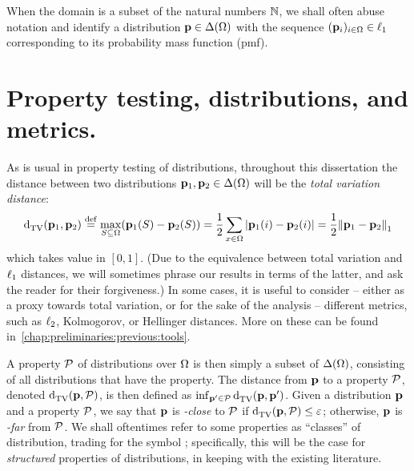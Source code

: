 When the domain is a subset of the natural numbers $\N$, we shall often abuse notation and identify a distribution $\p\in\distribs{\domain[\Omega]}$ with the sequence $(\p_i)_{i\in\domain}\in\lp[1]$ corresponding to its probability mass function (pmf).

\section{Property testing, distributions, and metrics.}\label{sec:preliminaries:basics}

As is usual in property testing of distributions, throughout this dissertation the distance between two distributions $\D_1, \D_2\in \distribs{\domain}$ will be the \emph{total variation distance}:
\begin{equation}\label{def:distance:tv}
\totalvardist{\D_1}{\D_2 } \eqdef \max_{S \subseteq \domain} (\D_1(S)-\D_2(S)) = \frac{1}{2} \sum_{x \in \domain}\abs{\D_1(i)-\D_2(i)} = \frac{1}{2} \normone{\D_1 - \D_2}
\end{equation}
which takes value in $[0,1]$. (Due to the equivalence between total variation and $\lp[1]$ distances, we will sometimes phrase our results in terms of the latter, and ask the reader for their forgiveness.) In some cases, it is useful to consider -- either as a proxy towards total variation, or for the sake of the analysis -- different metrics, such as $\lp[2]$, Kolmogorov, or Hellinger distances. More on these can be found in~\cref{chap:preliminaries:previous:tools}.

A property $\property$ of distributions over $\domain$ is then simply a subset of $\distribs{\domain}$, consisting of all distributions that have the property. The distance from $\D$ to a property $\property$, denoted $\totalvardist{\D}{\property}$, is then defined as $\inf_{\D^\prime \in \property} \totalvardist{\D}{\D^\prime}$. Given a distribution $\D$ and a property $\property$, we say that $\D$ is \emph{\eps-close} to $\property$ if $\totalvardist{\D}{\property}\leq \eps$; otherwise, $\D$ is \emph{\eps-far} from $\property$. We shall oftentimes refer to some properties as ``classes'' of distribution, trading \property for the symbol \class; specifically, this will be the case for \emph{structured} properties of distributions, in keeping with the existing literature.


